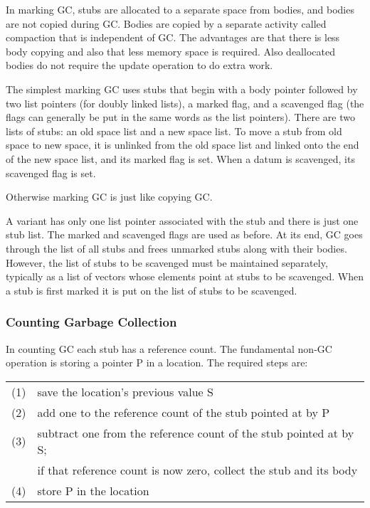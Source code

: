 \documentclass[12pt]{article}
\begin{document}
In marking GC, stubs are allocated to a separate space
from bodies, and bodies are not copied during GC.
Bodies are copied by a separate activity called
compaction that is independent of GC.  The advantages
are that there is less body copying and also that less memory
space is required.  Also deallocated bodies do not
require the update operation to do extra work.

The simplest marking GC uses stubs that begin with
a body pointer followed by two list pointers (for doubly linked lists),
a marked flag, and a scavenged flag (the flags can generally
be put in the same words as the list pointers).  There are two lists
of stubs: an old space list and a new space
list.  To move a stub from old space to new space,
it is unlinked from the old space list and linked
onto the end of the new space list, and its marked
flag is set.  When a datum is scavenged, its scavenged
flag is set.

Otherwise marking GC is just like copying GC.

A variant has only one list pointer associated with
the stub and there is just one stub list.  The
marked and scavenged flags are used as before.
At its end, GC goes through the list of all stubs
and frees unmarked stubs along with their bodies.
However, the list of stubs to be scavenged must
be maintained separately, typically as a list of
vectors whose elements point at stubs to be scavenged.
When a stub is first marked it is put on the list
of stubs to be scavenged.

\subsubsection{Counting Garbage Collection}

In counting GC each stub has a reference
count.  The fundamental non-GC operation is storing
a pointer P in a location.  The required steps are:
\begin{center}
\begin{tabular}{rl}
(1) & save the location's previous value S \\
(2) & add one to the reference count of the stub pointed at by P \\
(3) & subtract one from the reference count of the stub pointed at by S; \\
    & if that reference count is now zero, collect the stub and its body \\
(4) & store P in the location
\end{tabular}
\end{center}
\end{document}
